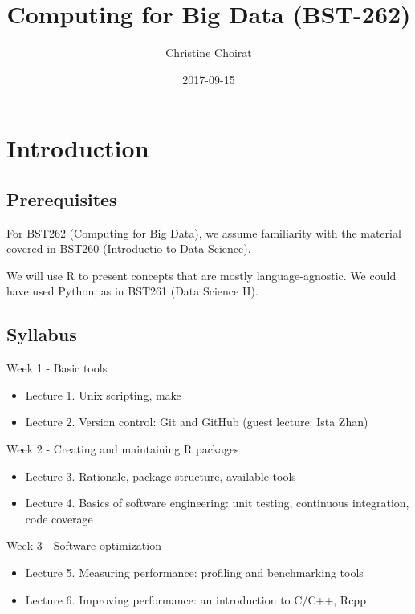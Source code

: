 \documentclass[]{book}
\title{Computing for Big Data (BST-262)}
\author{Christine Choirat}
\date{2017-09-15}
\providecommand{\tightlist}{%
  \setlength{\itemsep}{0pt}\setlength{\parskip}{0pt}}
\theoremstyle{definition}
\theoremstyle{definition}
\theoremstyle{definition}
\theoremstyle{remark}
\begin{document}
\maketitle

{
\setcounter{tocdepth}{1}
\tableofcontents
}
\chapter{Introduction}\label{intro}

\section{Prerequisites}\label{prerequisites}

For BST262 (Computing for Big Data), we assume familiarity with the
material covered in BST260 (Introductio to Data Science).

We will use R to present concepts that are mostly language-agnostic. We
could have used Python, as in BST261 (Data Science II).

\section{Syllabus}\label{syllabus}

Week 1 - Basic tools

\begin{itemize}
\tightlist
\item
  Lecture 1. Unix scripting, make
\item
  Lecture 2. Version control: Git and GitHub (guest lecture: Ista Zhan)
\end{itemize}

Week 2 - Creating and maintaining R packages

\begin{itemize}
\tightlist
\item
  Lecture 3. Rationale, package structure, available tools
\item
  Lecture 4. Basics of software engineering: unit testing, continuous
  integration, code coverage
\end{itemize}

Week 3 - Software optimization

\begin{itemize}
\tightlist
\item
  Lecture 5. Measuring performance: profiling and benchmarking tools
\item
  Lecture 6. Improving performance: an introduction to C/C++, Rcpp
\end{itemize}
\end{document}
